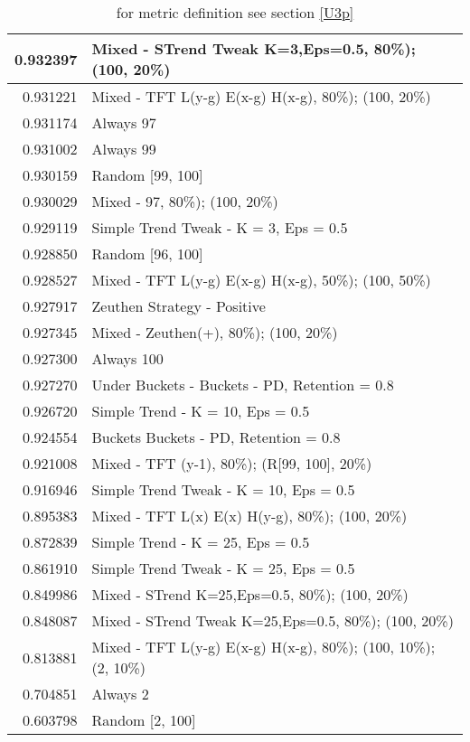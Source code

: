 \begin{table}[!hbtp]
\begin{footnotesize}
\begin{tabular}{|r|l|}
0.932397 & Mixed - {STrend Tweak K=3,Eps=0.5, 80\%); (100, 20\%)}\\ \hline
0.931221 & Mixed - {TFT L(y-g) E(x-g) H(x-g), 80\%); (100, 20\%)}\\ \hline
0.931174 & Always 97\\ \hline
0.931002 & Always 99\\ \hline
0.930159 & Random [99, 100]\\ \hline
0.930029 & Mixed - {97, 80\%); (100, 20\%)}\\ \hline
0.929119 & Simple Trend Tweak - K = 3, Eps = 0.5\\ \hline
0.928850 & Random [96, 100]\\ \hline
0.928527 & Mixed - {TFT L(y-g) E(x-g) H(x-g), 50\%); (100, 50\%)}\\ \hline
0.927917 & Zeuthen Strategy - Positive\\ \hline
0.927345 & Mixed - {Zeuthen(+), 80\%); (100, 20\%)}\\ \hline
0.927300 & Always 100\\ \hline
0.927270 & Under Buckets - Buckets - PD, Retention = 0.8\\ \hline
0.926720 & Simple Trend - K = 10, Eps = 0.5\\ \hline
0.924554 & Buckets Buckets - PD, Retention = 0.8\\ \hline
0.921008 & Mixed - {TFT (y-1), 80\%); (R[99, 100], 20\%)}\\ \hline
0.916946 & Simple Trend Tweak - K = 10, Eps = 0.5\\ \hline
0.895383 & Mixed - {TFT L(x) E(x) H(y-g), 80\%); (100, 20\%)}\\ \hline
0.872839 & Simple Trend - K = 25, Eps = 0.5\\ \hline
0.861910 & Simple Trend Tweak - K = 25, Eps = 0.5\\ \hline
0.849986 & Mixed - {STrend K=25,Eps=0.5, 80\%); (100, 20\%)}\\ \hline
0.848087 & Mixed - {STrend Tweak K=25,Eps=0.5, 80\%); (100, 20\%)}\\ \hline
0.813881 & Mixed - {TFT L(y-g) E(x-g) H(x-g), 80\%); (100, 10\%); (2, 10\%)}\\ \hline
0.704851 & Always 2\\ \hline
0.603798 & Random [2, 100]\\ \hline
\end{tabular}
\caption{for metric definition see section \eqref{U3p}}
\end{footnotesize}
\end{table}

